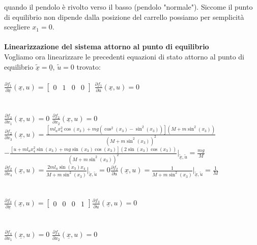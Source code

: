 quando il pendolo è rivolto verso il basso (pendolo "normale").
Siccome il punto di equilibrio non dipende dalla posizione del carrello possiamo per semplicità scegliere $x_1=0$.\\\\
\textbf{Linearizzazione del sistema attorno al punto di equilibrio}\\
Vogliamo ora linearizzare le precedenti equazioni di stato attorno al punto di equilibrio $\underline{\tilde{x}}=\underline{0}$, $\tilde{u}=0$ trovato: \\\\
$\displaystyle\frac{\partial{f_1}}{\partial{\underline{x}}}(\underline x,u)=
\begin{bmatrix}
0&1&0&0
\end{bmatrix}$\qquad
$\displaystyle\frac{\partial{f_1}}{\partial{u}}(\underline{x},u)=0$\\\\\\
$\displaystyle\frac{\partial{f_2}}{\partial{x_1}}(\underline{x},u)=0$\qquad
$\displaystyle\frac{\partial{f_2}}{\partial{x_2}}(\underline{x},u)=0$\\
$\displaystyle\frac{\partial{f_2}}{\partial{x_3}}(\underline{x},u)=\displaystyle\frac{[ml_ax_4^2\cos(x_3)+mg(\cos^2(x_3)-\sin^2(x_3))](M+m\sin^2(x_3))}{(M+m\sin^2(x_3))^2}$\\
$-\displaystyle\frac{[u+ml_ax_4^2\sin(x_3)+mg\sin(x_3)\cos(x_3)](2\sin(x_3)\cos(x_3))}{(M+m\sin^2(x_3))^2}\bigg|_{\underline{\tilde{x}},\tilde{u}}=\displaystyle\frac{mg}{M}$\\ $\displaystyle\frac{\partial{f_2}}{\partial{x_4}}(\underline{x},u)=\displaystyle\frac{2ml_a\sin(x_3)x_4}{M+m\sin^2(x_3)}\bigg|_{\underline{\tilde{x}},\tilde{u}}=0$\quad$\displaystyle\frac{\partial{f_2}}{\partial{u}}(\underline{x},u)=\displaystyle\frac{1}{M+m\sin^2(x_3)}\bigg|_{\underline{\tilde{x}},\tilde{u}}=\displaystyle\frac{1}{M}$\\\\\\
$\displaystyle\frac{\partial{f_3}}{\partial{\underline{x}}}(\underline x,u)=
\begin{bmatrix}
0&0&0&1
\end{bmatrix}$\qquad$\displaystyle\frac{\partial{f_3}}{\partial{u}}(\underline{x},u)=0$\\\\\\
$\displaystyle\frac{\partial{f_4}}{\partial{x_1}}(\underline{x},u)=0$\qquad
$\displaystyle\frac{\partial{f_4}}{\partial{x_2}}(\underline{x},u)=0$\\
